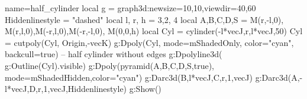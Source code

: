 \documentclass{standalone}
\begin{document}
\begin{luadraw}{name=half_cylinder}
local g = graph3d:new{size={10,10},viewdir={40,60}}
Hiddenlinestyle = "dashed"
local l, r, h = 3,2, 4
local A,B,C,D,S = M(r,-l,0), M(r,l,0),M(-r,l,0),M(-r,-l,0), M(0,0,h)
local Cyl = cylinder(-l*vecJ,r,l*vecJ,50)
Cyl = cutpoly(Cyl, {Origin,-vecK})
g:Dpoly(Cyl, {mode=mShadedOnly, color="cyan", backcull=true}) -- half cylinder without edges
g:Dpolyline3d( g:Outline(Cyl).visible) 
g:Dpoly(pyramid({A,B,C,D},S,true), {mode=mShadedHidden,color="cyan"})
g:Darc3d(B,l*vecJ,C,r,1,vecJ)
g:Darc3d(A,-l*vecJ,D,r,1,vecJ,Hiddenlinestyle)
g:Show()
\end{luadraw}
\end{document}
